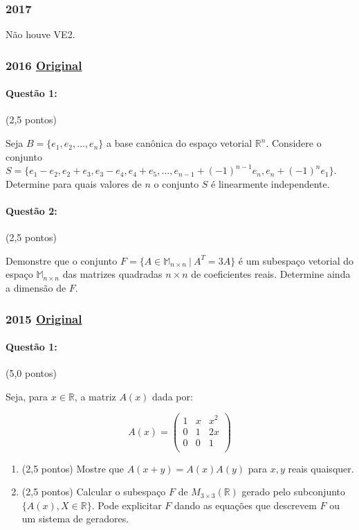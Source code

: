 \documentclass[12pt,a4paper]{article}
\newcommand{\original}[1]{\tiny \href{#1}{Original} \normalsize}
\begin{document}
\newpage


\subsubsection{2017}
Não houve VE2.
\newpage
\subsubsection{2016 \original{https://drive.google.com/file/d/1IoSmA359DYwP7JGRImxshns6t65fQ-NH/view?usp=sharing}}

\paragraph{Questão 1:} (2,5 pontos)

Seja $B=\{e_1,e_2,\dots,e_n\}$ a base canônica do espaço vetorial $\mathbb{R}^n$. Considere o conjunto $S=\{e_1-e_2,e_2+e_3,e_3-e_4,e_4+e_5,\dots,e_{n-1}+(-1)^{n-1}e_n,e_n+(-1)^{n}e_1\}$. Determine para quais valores de $n$ o conjunto $S$ é linearmente independente.

\paragraph{Questão 2:} (2,5 pontos)

Demonstre que o conjunto $F=\{A\in \mathbb{M}_{n \times n} \ | \ A^T=3A\}$ é um subespaço vetorial do espaço $\mathbb{M}_{n \times n}$ das matrizes quadradas $n\times n$ de coeficientes reais. Determine ainda a dimensão de $F$.


\newpage
\subsubsection{2015 \original{https://drive.google.com/file/d/1OAYL5U_CWi3ql44wBt8Ghes7WSzUt2XQ/view?usp=sharing}}

\paragraph{Questão 1:} (5,0 pontos)

Seja, para $x \in \mathbb{R}$, a matriz $A(x)$ dada por:

$$
A(x)=\left( 
\begin{array}{ccc}
1 & x & x^2 \\
0 & 1 & 2x  \\
0 & 0 & 1   \\
\end{array}
\right)
$$
\begin{enumerate}[label=(\alph*)]
\item (2,5 pontos) Mostre que $A(x+y)=A(x)A(y)$ para $x,y$ reais quaisquer.
\item (2,5 pontos) Calcular o subespaço $F$ de $M_{3\times 3} (\mathbb{R})$ gerado pelo subconjunto $\{A(x),X\in \mathbb{R}\}$. Pode explicitar $F$ dando as equações que descrevem $F$ ou um sistema de geradores.
\end{enumerate}
\end{document}
